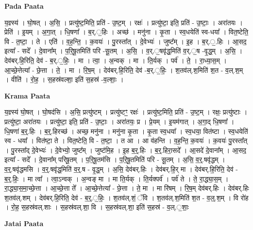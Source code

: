 \documentclass[17pt]{extarticle}
\begin{document}
\textbf{Pada Paata} \newline

य॒ज्ञ्स्य॑ । घो॒षत् । अ॒सि॒ । प्रत्यु॑ष्ट॒मिति॒ प्रति॑ - उ॒ष्ट॒म् । रक्षः॑ । प्रत्यु॑ष्टा॒ इति॒ प्रति॑ - उ॒ष्टाः॒ । अरा॑तयः । प्रेति॑ । इ॒यम् । अ॒गा॒त् । धि॒षणा᳚ । ब॒र्.॒हिः । अच्छ॑ । मनु॑ना । कृ॒ता । स्व॒धयेति॑ स्व-धया᳚ । वित॒ष्टेति॒ वि - त॒ष्टा॒ । ते । एति॑ । व॒ह॒न्ति॒ । क॒वयः॑ । पु॒रस्ता᳚त् । दे॒वेभ्यः॑ । जुष्ट᳚म् । इ॒ह । ब॒र्.॒.हिः । आ॒सद॒ इत्या᳚ - सदे᳚ । दे॒वाना᳚म् । प॒रि॒षू॒तमिति॑ परि -सू॒तम् । अ॒सि॒ । व॒र्.॒षवृ॑द्ध॒मिति॑ व॒र्.॒ष -वृ॒द्ध॒म् । अ॒सि॒ । देव॑बर्.हि॒रिति॒ देव॑ - ब॒र्.॒हिः॒ । मा । त्वा॒ । अ॒न्वक् । मा । ति॒र्यक् । पर्व॑ । ते॒ । रा॒ध्या॒स॒म् । आ॒च्छे॒त्तेत्या᳚ - छे॒त्ता । ते॒ । मा । रि॒ष॒म् । देव॑बर्.हि॒रिति॒ देव॑ -ब॒र्.॒हिः॒ । श॒तव॑ल्.श॒मिति॑ श॒त - व॒ल्.श॒म् । वीति॑ । रो॒ह॒ । स॒हस्र॑वल्शा॒ इति॑ स॒हस्र॑ -व॒ल्शाः॒ ।  \newline


\textbf{Krama Paata} \newline

य॒ज्ञ्स्य॑ घो॒षत् । घो॒षद॑सि । अ॒सि॒ प्रत्यु॑ष्टम् । प्रत्यु॑ष्टꣳ॒॒ रक्षः॑ । प्रत्यु॑ष्ट॒मिति॒ प्रति॑ - उ॒ष्ट॒म् । रक्षः॒ प्रत्यु॑ष्टाः । प्रत्यु॑ष्टा॒ अरा॑तयः । प्रत्यु॑ष्टा॒ इति॒ प्रति॑ - उ॒ष्टाः॒ । अरा॑तयः॒ प्र । प्रे॒यम् । इ॒यम॑गात् । अ॒गा॒द् धि॒षणा᳚ । धि॒षणा॑ ब॒र्॒.हिः । ब॒र्॒.हिरच्छ॑ । अच्छ॒ मनु॑ना । मनु॑ना कृ॒ता । कृ॒ता स्व॒धया᳚ । स्व॒धया॒ वित॑ष्टा । स्व॒धयेति॑ स्व - धया᳚ । वित॑ष्टा॒ ते । वित॒ष्टेति॒ वि - त॒ष्टा॒ । त आ । आ व॑हन्ति । व॒ह॒न्ति॒ क॒वयः॑ । क॒वयः॑ पु॒रस्ता᳚त् । पु॒रस्ता᳚द् दे॒वेभ्यः॑ । दे॒वेभ्यो॒ जुष्ट᳚म् । जुष्ट॑मि॒ह । इ॒ह ब॒र्॒.हिः । ब॒र्॒.हिरा॒सदे᳚ । आ॒सदे॑ दे॒वाना᳚म् । आ॒सद॒ इत्या᳚ - सदे᳚ । दे॒वाना᳚म् परिषू॒तम् । प॒रि॒षू॒तम॑सि । प॒रि॒षू॒तमिति॑ परि - सू॒तम् । अ॒सि॒ व॒र्॒.षवृ॑द्धम् । व॒र्॒.षवृ॑द्धमसि । व॒र्॒.षवृ॑द्ध॒मिति॑ व॒र्॒.ष - वृ॒द्ध॒म् । अ॒सि॒ देव॑बर्.हिः । देव॑बर्.हि॒र् मा । देव॑बर्.हि॒रिति॒ देव॑ - ब॒॒र्॒.हिः॒ । मा त्वा᳚ । त्वा॒ऽन्वक् । अ॒न्वङ्‍ मा । मा ति॒र्यक् । ति॒र्यक्पर्व॑ । पर्व॑ ते । ते॒ रा॒द्ध्या॒स॒म् । रा॒द्ध्या॒स॒मा॒च्छे॒त्ता । आ॒च्छे॒त्ता ते᳚ । आ॒च्छे॒त्तेत्या᳚ - छे॒त्ता । 
ते॒ मा । मा रि॑षम् । रि॒ष॒म् देव॑बर्.हिः । देव॑बर्.हिः श॒तव॑ल्.शम् । देव॑बर्.हि॒रिति॒ देव॑ - ब॒र्॒.॒हिः॒ । श॒तव॑ल्.शं॒ ॅवि । श॒तव॑ल्.श॒मिति॑ श॒त - व॒ल्॒.श॒म् । वि रो॑ह । रो॒ह॒ स॒हस्र॑वल्.शाः । स॒हस्र॑वल्.शा॒ वि । स॒हस्र॑वल्.शा॒ इति॑ स॒हस्र॑ - व॒ल्.॒शाः॒ \newline

\textbf{Jatai Paata} \newline
\end{document}
